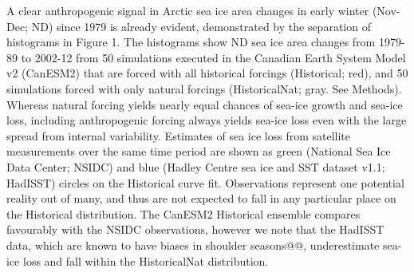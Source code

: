 \documentclass[grl]{AGUTeX}  %
\begin{document}
\begin{article}

A clear anthropogenic signal in Arctic sea ice area changes in early winter (Nov-Dec; ND) since 1979 is already evident, demonstrated by the separation of histograms in Figure 1. The histograms show ND sea ice area changes from 1979-89 to 2002-12 from 50 simulations executed in the Canadian Earth System Model v2 (CanESM2) that are forced with all historical forcings (Historical; red), and 50 simulations forced with only natural forcings (HistoricalNat; gray. See Methods). Whereas natural forcing yields nearly equal chances of sea-ice growth and sea-ice loss, including anthropogenic forcing always yields sea-ice loss even with the large spread from internal variability. Estimates of sea ice loss from satellite measurements over the same time period are shown as green (National Sea Ice Data Center; NSIDC) and blue (Hadley Centre sea ice and SST dataset v1.1; HadISST) circles on the Historical curve fit. Observations represent one potential reality out of many, and thus are not expected to fall in any particular place on the Historical distribution. The CanESM2 Historical ensemble compares favourably with the NSIDC observations, however we note that the HadISST data, which are known to have biases in shoulder seasons@@, underestimate sea-ice loss and fall within the HistoricalNat distribution. %


\end{article}
\end{document}

